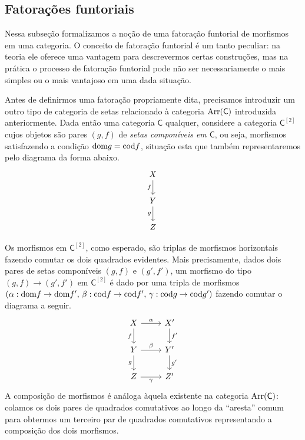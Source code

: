 \subsection{Fatorações funtoriais}

Nessa subseção formalizamos a noção de uma fatoração funtorial de morfismos em uma categoria.
O conceito de fatoração funtorial é um tanto peculiar: na teoria ele oferece uma vantagem para descrevermos certas construções, mas na prática o processo de fatoração funtorial pode não ser necessariamente o mais simples ou o mais vantajoso em uma dada situação.

Antes de definirmos uma fatoração propriamente dita, precisamos introduzir um outro tipo de categoria de setas relacionado à categoria $\mathrm{Arr}(\mathsf{C})$ introduzida anteriormente.
Dada então uma categoria $\mathsf{C}$ qualquer, considere a categoria $\mathsf{C}^{[2]}$ cujos objetos são pares $(g,f)$ de \emph{setas componíveis em $\mathsf{C}$}, ou seja, morfismos satisfazendo a condição $\mathrm{dom} g = \mathrm{cod} f$, situação esta que também representaremos pelo diagrama da forma abaixo.
\begin{displaymath}
  \begin{tikzcd}
    X
    \arrow[d, "f" swap]
    \\ Y
    \arrow[d, "g" swap]
    \\ Z
  \end{tikzcd}
\end{displaymath}

Os morfismos em $\mathsf{C}^{[2]}$, como esperado, são triplas de morfismos horizontais fazendo comutar os dois quadrados evidentes.
Mais precisamente, dados dois pares de setas componíveis $(g,f)$ e $(g',f')$, um morfismo do tipo $(g,f) \to (g',f')$ em $\mathsf{C}^{[2]}$ é dado por uma tripla de morfismos $(\alpha: \mathrm{dom} f \to \mathrm{dom} f',\, \beta: \mathrm{cod} f \to \mathrm{cod} f',\, \gamma: \mathrm{cod} g \to \mathrm{cod} g')$ fazendo comutar o diagrama a seguir.
\begin{displaymath}
  \begin{tikzcd}
    X
    \arrow[r, "\alpha"]
    \arrow[d, "f" swap]
    & X'
    \arrow[d, "f'"]
    \\ Y
    \arrow[r, "\beta"]
    \arrow[d, "g" swap]
    & Y'
    \arrow[d, "g'"]
    \\ Z
    \arrow[r, "\gamma" swap]
    & Z'
  \end{tikzcd}
\end{displaymath}
A composição de morfismos é análoga àquela existente na categoria $\mathrm{Arr}(\mathsf{C})$: colamos os dois pares de quadrados comutativos ao longo da ``aresta'' comum para obtermos um terceiro par de quadrados comutativos representando a composição dos dois morfismos.

